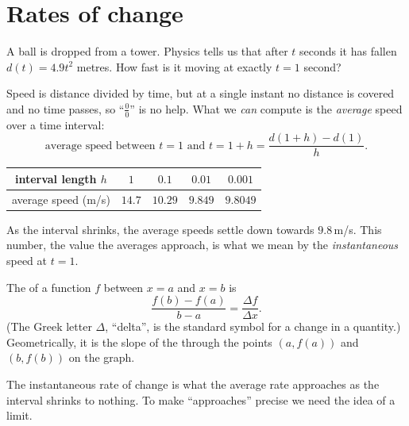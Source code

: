 \section{Rates of change}\label{sec:rates}

A ball is dropped from a tower. Physics tells us that after $t$ seconds it has
fallen $d(t) = 4.9t^2$ metres. How fast is it moving at exactly $t = 1$
second?

Speed is distance divided by time, but at a single instant no distance is
covered and no time passes, so ``$\frac00$'' is no help. What we \emph{can}
compute is the \emph{average} speed over a time interval:
\[
  \text{average speed between } t = 1 \text{ and } t = 1 + h
  = \frac{d(1 + h) - d(1)}{h}.
\]

\begin{center}
\renewcommand{\arraystretch}{1.2}
\begin{tabular}{c|cccc}
interval length $h$ & $1$ & $0.1$ & $0.01$ & $0.001$\\
\hline
average speed (m/s) & $14.7$ & $10.29$ & $9.849$ & $9.8049$
\end{tabular}
\end{center}

As the interval shrinks, the average speeds settle down towards $9.8$\,m/s.
This number, the value the averages approach, is what we mean by the
\emph{instantaneous} speed at $t = 1$.

\begin{definition}\label{def:average-rate}
The  of a function $f$ between $x = a$ and
$x = b$ is
\[
  \frac{f(b) - f(a)}{b - a} = \frac{\Delta f}{\Delta x}.
\]
(The Greek letter $\Delta$, ``delta'', is the standard symbol for a change in a
quantity.) Geometrically, it is the slope of the  through the
points $(a, f(a))$ and $(b, f(b))$ on the graph.
\end{definition}

The instantaneous rate of change is what the average rate approaches as the
interval shrinks to nothing. To make ``approaches'' precise we need the idea of
a limit.

